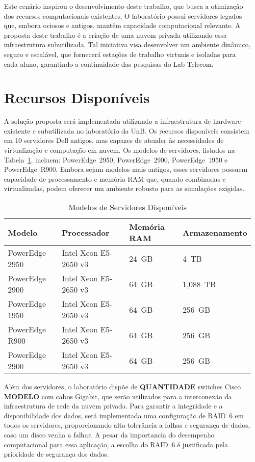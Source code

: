 Este cenário inspirou o desenvolvimento deste trabalho, que busca a otimização dos recursos computacionais existentes. O laboratório possui servidores legados que, embora ociosos e antigos, mantêm capacidade computacional relevante. A proposta deste trabalho é a criação de uma nuvem privada utilizando essa infraestrutura subutilizada. Tal iniciativa visa desenvolver um ambiente dinâmico, seguro e escalável, que fornecerá estações de trabalho virtuais e isoladas para cada aluno, garantindo a continuidade das pesquisas do Lab Telecom.

\section{Recursos Disponíveis}

A solução proposta será implementada utilizando a infraestrutura de hardware existente e subutilizada no laboratório da UnB. Os recursos disponíveis consistem em 10 servidores Dell antigos, mas capazes de atender às necessidades de virtualização e computação em nuvem. Os modelos de servidores, listados na Tabela~\ref{tab:servidores}, incluem: PowerEdge~2950, PowerEdge~2900, PowerEdge~1950 e PowerEdge~R900. Embora sejam modelos mais antigos, esses servidores possuem capacidade de processamento e memória RAM que, quando combinadas e virtualizadas, podem oferecer um ambiente robusto para as simulações exigidas.

\begin{table}[htb]
\centering
\caption{Modelos de Servidores Disponíveis}
\label{tab:servidores}
\begin{tabular}{l l l l}
\toprule
Modelo & Processador & Memória RAM & Armazenamento\\ \midrule
PowerEdge 2950 & Intel Xeon E5-2650 v3 & 24~GB & 4~TB \\
PowerEdge 2900 & Intel Xeon E5-2650 v3 & 64~GB & 1{,}088~TB \\
PowerEdge 1950 & Intel Xeon E5-2650 v3 & 64~GB & 256~GB \\
PowerEdge R900 & Intel Xeon E5-2650 v3 & 64~GB & 256~GB \\
PowerEdge 2900 & Intel Xeon E5-2650 v3 & 64~GB & 256~GB \\
\bottomrule
\end{tabular}
\end{table}

Além dos servidores, o laboratório dispõe de \textbf{QUANTIDADE} switches Cisco \textbf{MODELO} com cabos Gigabit, que serão utilizados para a interconexão da infraestrutura de rede da nuvem privada. Para garantir a integridade e a disponibilidade dos dados, será implementada uma configuração de RAID~6 em todos os servidores, proporcionando alta tolerância a falhas e segurança de dados, caso um disco venha a falhar. A pesar da importancia do desempenho computacional para essa aplicação, a escolha do RAID~6 é justificada pela prioridade de segurança dos dados.

